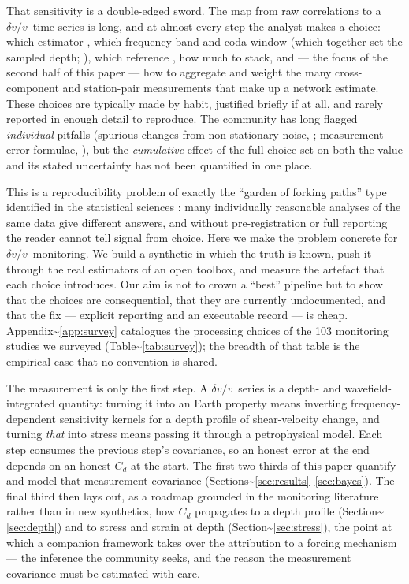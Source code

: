 \documentclass[
  11pt,
  letterpaper,
]{article}
\providecommand{\dvv}{\ensuremath{\delta v/v}}
\begin{document}
That sensitivity is a double-edged sword. The map from raw correlations
to a \dvv~time series is long, and at almost every step the analyst
makes a choice: which estimator \citep{Yuan2021}, which frequency band
and coda window (which together set the sampled depth;
\citeauthor{Obermann2013}
\citetext{\citeyear{Obermann2013}; \citealp{Obermann2016}}), which
reference \citep{Brenguier2014}, how much to stack, and --- the focus of
the second half of this paper --- how to aggregate and weight the many
cross-component and station-pair measurements that make up a network
estimate. These choices are typically made by habit, justified briefly
if at all, and rarely reported in enough detail to reproduce. The
community has long flagged \emph{individual} pitfalls (spurious changes
from non-stationary noise, \citet{Zhan2013}; measurement-error formulae,
\citeauthor{Clarke2011}
\citetext{\citeyear{Clarke2011}; \citealp{Weaver2011}}), but the
\emph{cumulative} effect of the full choice set on both the value and
its stated uncertainty has not been quantified in one place.

This is a reproducibility problem of exactly the ``garden of forking
paths'' type identified in the statistical sciences
\citep{Gelman2013, Steegen2016}: many individually reasonable analyses
of the same data give different answers, and without pre-registration or
full reporting the reader cannot tell signal from choice. Here we make
the problem concrete for \dvv~monitoring. We build a synthetic in which
the truth is known, push it through the real estimators of an open
toolbox, and measure the artefact that each choice introduces. Our aim
is not to crown a ``best'' pipeline but to show that the choices are
consequential, that they are currently undocumented, and that the fix
--- explicit reporting and an executable record --- is cheap.
Appendix\textasciitilde{}\ref{app:survey} catalogues the processing
choices of the 103 monitoring studies we surveyed
(Table\textasciitilde{}\ref{tab:survey}); the breadth of that table is
the empirical case that no convention is shared.

The measurement is only the first step. A \dvv~series is a depth- and
wavefield-integrated quantity: turning it into an Earth property means
inverting frequency-dependent sensitivity kernels for a depth profile of
shear-velocity change, and turning \emph{that} into stress means passing
it through a petrophysical model. Each step consumes the previous step's
covariance, so an honest error at the end depends on an honest \(C_d\)
at the start. The first two-thirds of this paper quantify and model that
measurement covariance
(Sections\textasciitilde{}\ref{sec:results}--\ref{sec:bayes}). The final
third then lays out, as a roadmap grounded in the monitoring literature
rather than in new synthetics, how \(C_d\) propagates to a depth profile
(Section\textasciitilde{}\ref{sec:depth}) and to stress and strain at
depth (Section\textasciitilde{}\ref{sec:stress}), the point at which a
companion framework takes over the attribution to a forcing mechanism
--- the inference the community seeks, and the reason the measurement
covariance must be estimated with care.
\end{document}
